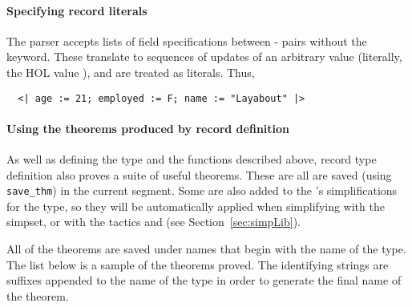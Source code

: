 \paragraph{Specifying record literals}

The parser accepts lists of field specifications between
\holtxt{<|}-\holtxt{|>} pairs without the  keyword.
These translate to sequences of updates of an arbitrary value
(literally, the HOL value ), and are treated as literals.
Thus,
%
\begin{hol}
\begin{verbatim}
  <| age := 21; employed := F; name := "Layabout" |>
\end{verbatim}
\end{hol}

\paragraph{Using the theorems produced by record definition}

As well as defining the type and the functions described above, record
type definition also proves a suite of useful theorems.  These are all
are saved (using {\tt save\_thm}) in the current segment.  %
%
%
Some are also added to the 's simplifications for the
type, so they will be automatically applied when simplifying with the
 simpset, or with the tactics  and
 (see Section~\ref{sec:simpLib}).

All of the theorems are saved under names that begin with the name of
the type.  The list below is a sample of the theorems proved.  The
identifying strings are suffixes appended to the name of the type in
order to generate the final name of the theorem.

\newcommand{\rewruse}{This theorem is installed in the \texttt{TypeBase}.}
\newcommand{\field}[1]{\mbox{\it field}_{#1}}
\newcommand{\update}{\mbox{\tt\_fupd}}

